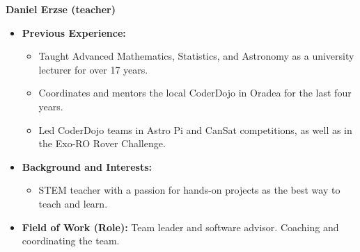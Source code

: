     \item[] \textbf{Daniel Erzse (teacher)}
    \begin{itemize}[label=]
        \item[\faCogs] \textbf{Previous Experience:} 
        \begin{itemize}[label=]
            \item Taught Advanced Mathematics, Statistics, and Astronomy as a university lecturer for over 17 years.
            \item Coordinates and mentors the local CoderDojo in Oradea for the last four years.
            \item Led CoderDojo teams in Astro Pi and CanSat competitions, as well as in the Exo-RO Rover Challenge.
        \end{itemize}
        \item[\faGraduationCap] \textbf{Background and Interests:} 
        \begin{itemize}[label=]
            \item STEM teacher with a passion for hands-on projects as the best way to teach and learn.
        \end{itemize}
        \item[\faMicroscope] \textbf{Field of Work (Role):} Team leader and software advisor. Coaching and coordinating the team.
    \end{itemize}
    \vspace{0.2 cm}
